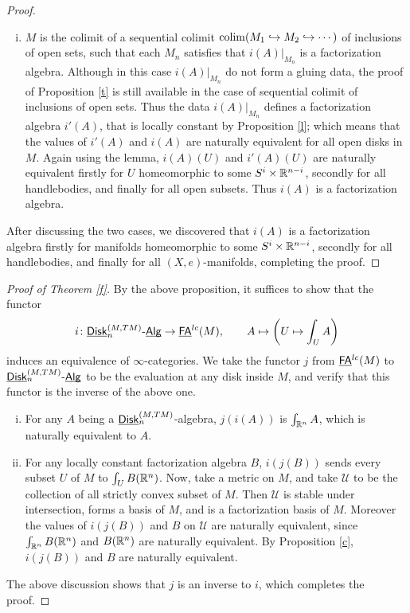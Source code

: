 \documentclass[twoside]{article}
\begin{document}
\begin{proof}
\begin{enumerate}[i)]
        \item $M$ is the colimit of a sequential colimit $\mathop{\operatorname{colim}}(M_1\hookrightarrow M_2
        \hookrightarrow\cdots)$ of inclusions of open sets, such that each $M_n$
        satisfies that $i(A)|_{M_n}$ is a factorization algebra. Although in this case
        $i(A)|_{M_n}$ do not form a gluing data, the proof of Proposition \ref{t}
        is still available in the case of sequential colimit of inclusions of open sets.
        Thus the data $i(A)|_{M_n}$ defines a factorization algebra $i'(A)$, that is
        locally constant by Proposition \ref{l}; which means that the values of 
        $i'(A)$ and $i(A)$ are naturally equivalent for all open disks in $M$. 
        Again using the lemma, $i(A)(U)$ and $i'(A)(U)$ are naturally equivalent
        firstly for $U$ homeomorphic to some $S^i\times\mathbb{R}^{n-i}$, secondly for
        all handlebodies, and finally for all open subsets. Thus $i(A)$ is a
        factorization algebra.
    \end{enumerate}

    After discussing the two cases, we discovered that $i(A)$ is a factorization
    algebra firstly for manifolds homeomorphic to some $S^i\times\mathbb{R}^{n-i}$,
    secondly for all handlebodies, and finally for all $(X,e)$-manifolds,
    completing the proof.
\end{proof}

\begin{proof}[Proof of Theorem \ref{f}]
    By the above proposition, it suffices to show that the functor 
    $$i\colon\underline{\smash{\mathsf{Disk}}}_n^{(M,TM)}\text{-}\underline{\smash{\mathsf{Alg}}}\to\underline{\smash{\mathsf{FA}}}^{lc}(M),\qquad A\mapsto\left(U\mapsto\int_UA\right)$$
    induces an equivalence of $\infty$-categories. We take the functor $j$ from
    $\underline{\smash{\mathsf{FA}}}^{lc}(M)$ to $\underline{\smash{\mathsf{Disk}}}_n^{(M,TM)}\text{-}\underline{\smash{\mathsf{Alg}}}$ to be the evaluation at any
    disk inside $M$, and verify that this functor is the inverse of the above one.

    \begin{enumerate}[i)]
        \item For any $A$ being a $\underline{\smash{\mathsf{Disk}}}_n^{(M,TM)}$-algebra, $j(i(A))$ is 
        $\int_{\mathbb{R}^n}A$, which is naturally equivalent to $A$.

        \item For any locally constant factorization algebra $B$, $i(j(B))$ sends
        every subset $U$ of $M$ to $\int_UB(\mathbb{R}^n)$. Now, take a metric on $M$, and take
        $\mathscr U$ to be the collection of all strictly convex subset of $M$.
        Then $\mathscr U$ is stable under intersection, forms a basis of $M$, and
        is a factorization basis of $M$. Moreover the values of $i(j(B))$ and $B$ on
        $\mathscr U$ are naturally equivalent, since $\int_{\mathbb{R}^n}B(\mathbb{R}^n)$ and $B(\mathbb{R}^n)$
        are naturally equivalent. By Proposition \ref{c}, $i(j(B))$ and $B$ are
        naturally equivalent.
    \end{enumerate}

    The above discussion shows that $j$ is an inverse to $i$, which completes
    the proof. 
\end{proof}
\end{document}
